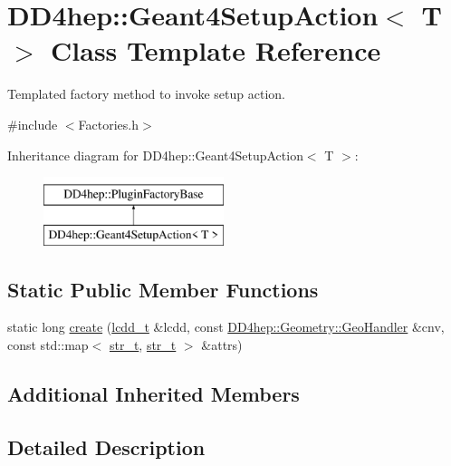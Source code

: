 \hypertarget{class_d_d4hep_1_1_geant4_setup_action}{}\section{D\+D4hep\+:\+:Geant4\+Setup\+Action$<$ T $>$ Class Template Reference}
\label{class_d_d4hep_1_1_geant4_setup_action}


Templated factory method to invoke setup action.  




{\ttfamily \#include $<$Factories.\+h$>$}

Inheritance diagram for D\+D4hep\+:\+:Geant4\+Setup\+Action$<$ T $>$\+:\begin{figure}[H]
\begin{center}
\leavevmode
\includegraphics[height=2.000000cm]{class_d_d4hep_1_1_geant4_setup_action}
\end{center}
\end{figure}
\subsection*{Static Public Member Functions}
\begin{DoxyCompactItemize}
\item 
static long \hyperlink{class_d_d4hep_1_1_geant4_setup_action_a361e27050900a95f90d6cf8a199a0820}{create} (\hyperlink{struct_d_d4hep_1_1_plugin_factory_base_a61b840cc18cdd24ae2e383da306b9c9a}{lcdd\+\_\+t} \&lcdd, const \hyperlink{class_d_d4hep_1_1_geometry_1_1_geo_handler}{D\+D4hep\+::\+Geometry\+::\+Geo\+Handler} \&cnv, const std\+::map$<$ \hyperlink{struct_d_d4hep_1_1_plugin_factory_base_aaa4c6d8801f70db2776c5473abc92692}{str\+\_\+t}, \hyperlink{struct_d_d4hep_1_1_plugin_factory_base_aaa4c6d8801f70db2776c5473abc92692}{str\+\_\+t} $>$ \&attrs)
\end{DoxyCompactItemize}
\subsection*{Additional Inherited Members}


\subsection{Detailed Description}
